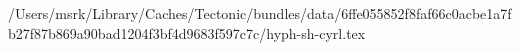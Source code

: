 /Users/msrk/Library/Caches/Tectonic/bundles/data/6ffe055852f8faf66c0acbe1a7fb27f87b869a90bad1204f3bf4d9683f597c7c/hyph-sh-cyrl.tex